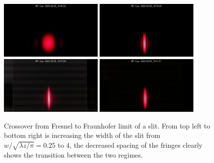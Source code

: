 \documentclass[letterpaper, reqno,11pt]{article}
\begin{document}
\begin{figure}[tb]
    \centering
    \includegraphics[width=0.45\textwidth]{Fourier/0.25_redo/media/im_0248_20240202_193032.jpg}
    \includegraphics[width=0.45\textwidth]{Fourier/1_redo/media/im_0254_20240202_193430.jpg}
    \includegraphics[width=0.45\textwidth]{Fourier/2_redo/media/im_0258_20240202_193756.jpg}
    \includegraphics[width=0.45\textwidth]{Fourier/4_redo/media/im_0265_20240202_194101.jpg}
    \caption{Crossover from Fresnel to Fraunhofer limit of a slit. From top left to bottom right is increasing the width of the slit from $w /\sqrt{\lambda z /\pi}=0.25$ to $4$, the decreased spacing of the fringes clearly shows the transition between the two regimes.}
    \label{fig:3-2-2C}
\end{figure}
\end{document}
